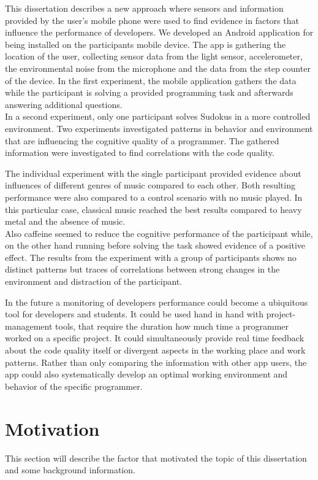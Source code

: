 \bigbreak
This dissertation describes a new approach where sensors and information provided by the user's mobile phone were used to find evidence in factors that influence the performance of developers. 
We developed an Android application for being installed on the participants mobile device. The app is gathering the location of the user, collecting sensor data from the light sensor, accelerometer, the environmental noise from the microphone and the data from the step counter of the device. \bigbreak
In the first experiment, the mobile application gathers the data while the participant is solving a provided programming task and afterwards answering additional questions. \\
In a second experiment, only one participant solves Sudokus in a more controlled environment. 
Two experiments investigated patterns in behavior and environment that are influencing the cognitive quality of a programmer. The gathered information were investigated to find correlations with the code quality.\\
\bigbreak

The individual experiment with the single participant provided evidence about influences of different genres of music compared to each other. Both resulting performance were also compared to a control scenario with no music played. In this particular case, classical music reached the best results compared to heavy metal and the absence of music.\\
Also caffeine seemed to reduce the cognitive performance of the participant while, on the other hand running before solving the task showed evidence of a positive effect.
The results from the experiment with a group of participants shows no distinct patterns but traces of correlations between strong changes in the environment and distraction of the participant.  

\bigbreak
In the future a monitoring of developers performance could become a ubiquitous tool for developers and students. It could be used hand in hand with project-management tools, that require the duration how much time a programmer worked on a specific project. It could simultaneously provide real time feedback about the code quality itself or divergent aspects in the working place and work patterns. Rather than only comparing the information with other app users, the app could also systematically develop an optimal working environment and behavior of the specific programmer.

\section{Motivation}
This section will describe the factor that motivated the topic of this dissertation and some background information. 

